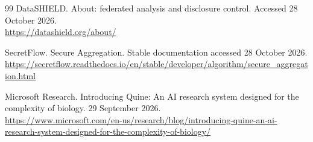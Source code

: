 \begin{thebibliography}{99}
 DataSHIELD. About: federated analysis and disclosure control. Accessed 28 October 2026.\\\url{https://datashield.org/about/}

 SecretFlow. Secure Aggregation. Stable documentation accessed 28 October 2026.\\\url{https://secretflow.readthedocs.io/en/stable/developer/algorithm/secure_aggregation.html}

 Microsoft Research. Introducing Quine: An AI research system designed for the complexity of biology. 29 September 2026.\\\url{https://www.microsoft.com/en-us/research/blog/introducing-quine-an-ai-research-system-designed-for-the-complexity-of-biology/}

\end{thebibliography}
